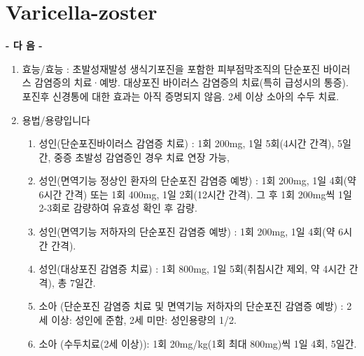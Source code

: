 \section{Varicella-zoster}
{
\par
\begin{center}\textbf{- 다          음 -}\end{center}
\begin{enumerate}[가.]\tightlist
\item 효능/효능 : 초발성\cntrdot{}재발성 생식기포진을 포함한 피부\cntrdot{}점막조직의 단순포진 바이러스 감염증의 치료·예방.\newline 
대상포진 바이러스 감염증의 치료(특히 급성시의 통증). 포진후 신경통에 대한 효과는 아직 증명되지 않음. \newline
2세 이상 소아의 수두 치료.

\item 용법/용량입니다
	\begin{enumerate}[1)]\tightlist
	\item 성인(단순포진바이러스 감염증 치료) : 1회 200mg, 1일 5회(4시간 간격), 5일간, 중증 초발성 감염증인 경우 치료 연장 가능, 
	\item 성인(면역기능 정상인 환자의 단순포진 감염증 예방) : 1회 200mg, 1일 4회(약 6시간 간격) 또는 1회 400mg, 1일 2회(12시간 간격). 그 후 1회 200mg씩 1일 2-3회로 감량하여 유효성 확인 후 감량. 
	\item 성인(면역기능 저하자의 단순포진 감염증 예방) : 1회 200mg, 1일 4회(약 6시간 간격). 
	\item 성인(대상포진 감염증 치료) : 1회 800mg, 1일 5회(취침시간 제외, 약 4시간 간격), 총 7일간. 
	\item 소아 (단순포진 감염증 치료 및 면역기능 저하자의 단순포진 감염증 예방) : 2세 이상: 성인에 준함, 2세 미만: 성인용량의 1/2. 
	\item 소아 (수두치료(2세 이상)): 1회 20mg/kg(1회 최대 800mg)씩 1일 4회, 5일간. 
	\end{enumerate}
\end{enumerate}
}
